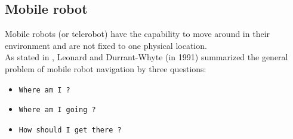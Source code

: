 \subsection{Mobile robot}
\label{sec:mobile}

Mobile robots (or telerobot) have the capability to move around
in their environment and are not fixed to one physical location.
\\
As stated in \cite{robot:whereami}, Leonard and Durrant-Whyte
(in 1991) summarized the general problem of mobile robot navigation
by three questions:

\begin{itemize}
\item \texttt{Where am I ?}
\item \texttt{Where am I going ?}
\item \texttt{How should I get there ?}
\end{itemize}

